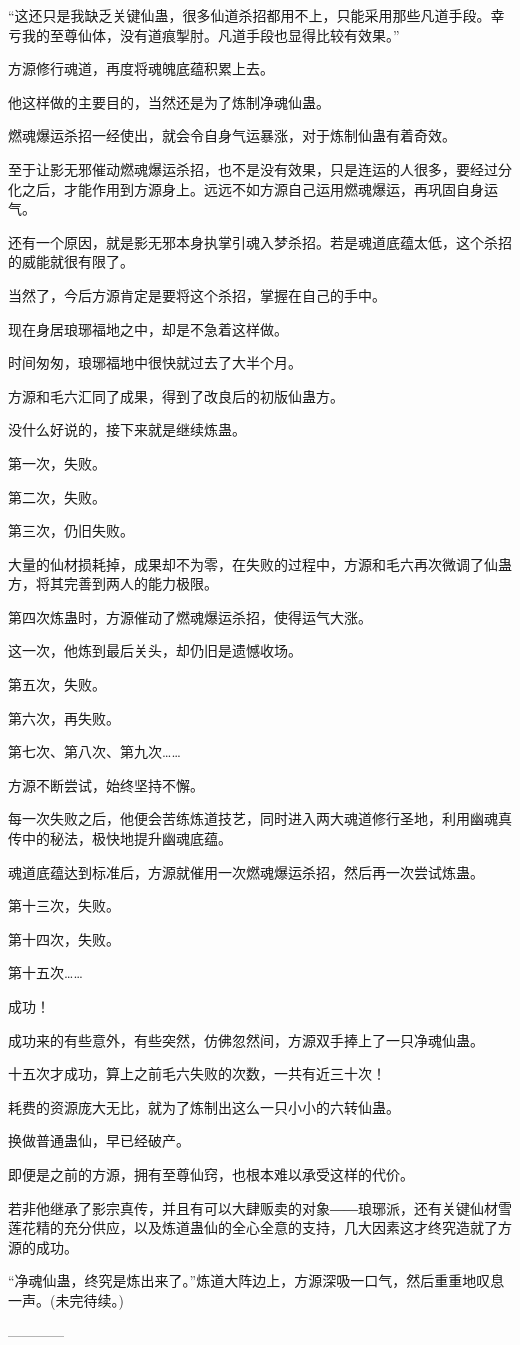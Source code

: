 \begin{this_body}
“这还只是我缺乏关键仙蛊，很多仙道杀招都用不上，只能采用那些凡道手段。幸亏我的至尊仙体，没有道痕掣肘。凡道手段也显得比较有效果。”

方源修行魂道，再度将魂魄底蕴积累上去。

他这样做的主要目的，当然还是为了炼制净魂仙蛊。

燃魂爆运杀招一经使出，就会令自身气运暴涨，对于炼制仙蛊有着奇效。

至于让影无邪催动燃魂爆运杀招，也不是没有效果，只是连运的人很多，要经过分化之后，才能作用到方源身上。远远不如方源自己运用燃魂爆运，再巩固自身运气。

还有一个原因，就是影无邪本身执掌引魂入梦杀招。若是魂道底蕴太低，这个杀招的威能就很有限了。

当然了，今后方源肯定是要将这个杀招，掌握在自己的手中。

现在身居琅琊福地之中，却是不急着这样做。

时间匆匆，琅琊福地中很快就过去了大半个月。

方源和毛六汇同了成果，得到了改良后的初版仙蛊方。

没什么好说的，接下来就是继续炼蛊。

第一次，失败。

第二次，失败。

第三次，仍旧失败。

大量的仙材损耗掉，成果却不为零，在失败的过程中，方源和毛六再次微调了仙蛊方，将其完善到两人的能力极限。

第四次炼蛊时，方源催动了燃魂爆运杀招，使得运气大涨。

这一次，他炼到最后关头，却仍旧是遗憾收场。

第五次，失败。

第六次，再失败。

第七次、第八次、第九次……

方源不断尝试，始终坚持不懈。

每一次失败之后，他便会苦练炼道技艺，同时进入两大魂道修行圣地，利用幽魂真传中的秘法，极快地提升幽魂底蕴。

魂道底蕴达到标准后，方源就催用一次燃魂爆运杀招，然后再一次尝试炼蛊。

第十三次，失败。

第十四次，失败。

第十五次……

成功！

成功来的有些意外，有些突然，仿佛忽然间，方源双手捧上了一只净魂仙蛊。

十五次才成功，算上之前毛六失败的次数，一共有近三十次！

耗费的资源庞大无比，就为了炼制出这么一只小小的六转仙蛊。

换做普通蛊仙，早已经破产。

即便是之前的方源，拥有至尊仙窍，也根本难以承受这样的代价。

若非他继承了影宗真传，并且有可以大肆贩卖的对象――琅琊派，还有关键仙材雪莲花精的充分供应，以及炼道蛊仙的全心全意的支持，几大因素这才终究造就了方源的成功。

“净魂仙蛊，终究是炼出来了。”炼道大阵边上，方源深吸一口气，然后重重地叹息一声。(未完待续。)

------------

\end{this_body}

